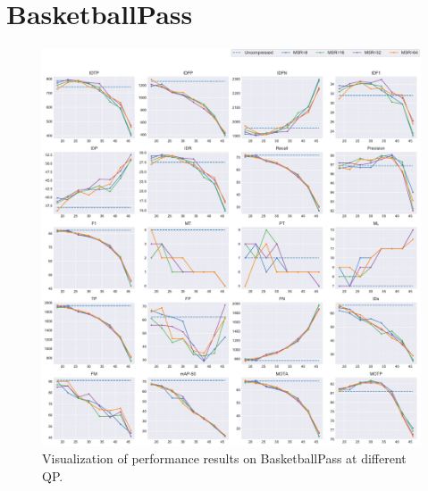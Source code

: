 
\section{BasketballPass}
\label{sec:appendix/BasketballPass_all}


\begin{figure}[!htbp]
\centering
\includegraphics[width=1.0\linewidth]{img/appendix/BasketballPass_all_multiplots_qp.pdf}
\caption[Visualization of performance results on BasketballPass at different QP]
{Visualization of performance results on BasketballPass at different QP.}
\label{fig:BasketballPass_all_qp}
\end{figure}

